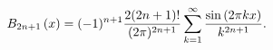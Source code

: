 \[B_{2n+1}\left(x\right)=(-1)^{n+1}\frac{2(2n+1)!}{(2\pi)^{2n+1}}\sum_{k=1}^{%
\infty}\frac{\sin\left(2\pi kx\right)}{k^{2n+1}}.\]